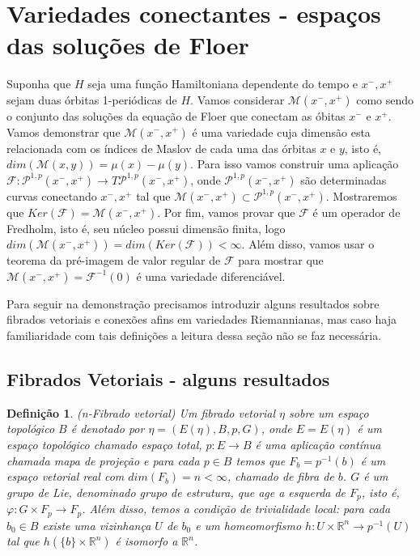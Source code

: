 \documentclass[12pt]{book}
\newtheorem{definicao}[teorema]{Definição}
\newcommand{\caminhosexponenciaisconectantes}[2]{\mathcal{P}^{1,p}(#1, #2)}
\newcommand{\caminhosexponenciaisconectantespadrao}{\caminhosexponenciaisconectantes{x^{-}}{x^{+}}}
\newcommand{\mapafloer}{\mathcal{F}}
\newcommand{\orbitasconectantes}[2]{\mathcal{M}(#1, #2)}
\newcommand{\orbitasconectantespadrao}{\mathcal{M}(x^{-}, x^{+})}
\newcommand{\real}[1]{\mathbb{R}^{#1}}
\begin{document}
	\section{Variedades conectantes - espaços das soluções de Floer}
	Suponha que $H$ seja uma função Hamiltoniana dependente do tempo e $x^{-}, x^{+}$ sejam duas órbitas 1-periódicas de $H$. Vamos considerar $\orbitasconectantespadrao$ como sendo o conjunto das soluções da equação de Floer que conectam as óbitas $x^{-}$ e $x^{+}$. Vamos demonstrar que $\orbitasconectantespadrao$ é uma variedade cuja dimensão esta relacionada com os índices de Maslov de cada uma das órbitas $x$ e $y$, isto é, $dim(\orbitasconectantes{x}{y}) = \mu(x)-\mu(y)$. Para  isso vamos construir uma aplicação $\mapafloer: \caminhosexponenciaisconectantespadrao \to T\caminhosexponenciaisconectantespadrao$, onde $\caminhosexponenciaisconectantespadrao$ são determinadas curvas conectando $x^{-}, x^{+}$ tal que $\orbitasconectantespadrao \subset \caminhosexponenciaisconectantespadrao$. Mostraremos que $Ker(\mapafloer) = \orbitasconectantespadrao$. Por fim, vamos provar que $\mapafloer$ é um operador de Fredholm, isto é, seu núcleo possui dimensão finita, logo $dim (\orbitasconectantespadrao) = dim (Ker(\mapafloer)) < \infty$. Além disso, vamos usar o teorema da pré-imagem de valor regular de $\mapafloer$ para mostrar que $\orbitasconectantespadrao = \mapafloer^{-1}(0)$ é uma variedade diferenciável.

	Para seguir na demonstração precisamos introduzir alguns resultados sobre fibrados vetoriais e conexões afins em variedades Riemannianas, mas caso haja familiaridade com tais definições a leitura dessa seção não se faz necessária.
	
	\subsection{Fibrados Vetoriais - alguns resultados}
	\begin{definicao}
		(n-Fibrado vetorial) Um fibrado vetorial $\eta$ sobre um espaço topológico $B$ é denotado por $\eta = (E(\eta), B, p, G)$, onde $E=E(\eta)$ é um espaço topológico chamado espaço total, $p:E\to B$ é uma aplicação contínua chamada mapa de projeção e para cada $p \in B$ temos que $F_{b}=p^{-1}(b)$ é um espaço vetorial real com $dim(F_{b}) = n < \infty$, chamado de fibra de $b$. $G$ é um grupo de Lie, denominado grupo de estrutura, que age a esquerda de $F_{p}$, isto é, $\varphi:G\times F_{p} \to F_{p}$. Além disso, temos a condição de trivialidade local: para cada $b_{0} \in B$ existe uma vizinhança $U$ de $b_{0}$ e um homeomorfismo $h:U\times\real{n} \to p^{-1}(U)$ tal que $h(\{b\} \times \real{n})$ é isomorfo a $\real{n}$.
	\end{definicao}
	
\end{document}
